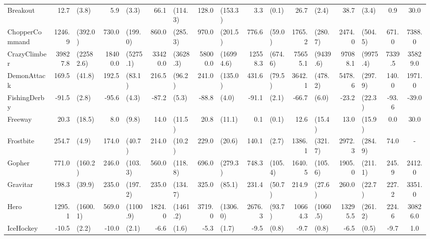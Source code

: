 \begin{landscape}
\begin{changemargin}{0cm}{0cm}
\begin{center}
\begin{table}[!htbp]
\begin{tabular}{l|rl|rl|rl|rl|rl|rl|rl|c|c}
Breakout       &     12.7 &      (3.8) &      5.9 &     (3.3) &       66.1 &      (114.3) &    128.0 &    (153.3) &      3.3 &    (0.1) &     26.7 &      (2.4) &      38.7 &      (3.4) &      0.9 &     30.0 \\
ChopperCommand &   1246.9 &    (392.0) &    730.0 &   (199.0) &      860.0 &      (285.3) &    970.0 &    (201.5) &    776.6 &   (59.0) &   1765.2 &    (280.7) &    2474.0 &    (504.5) &    671.0 &   7388.0 \\
CrazyClimber   &  39827.8 &  (22582.6) &  18400.0 &  (5275.1) &    33420.0 &     (3628.3) &  58000.0 &  (16994.6) &  12558.3 &  (674.6) &  75655.1 &   (9439.6) &   97088.1 &   (9975.4) &   7339.5 &  35829.0 \\
DemonAttack    &    169.5 &     (41.8) &    192.5 &    (83.1) &      216.5 &       (96.2) &    241.0 &    (135.0) &    431.6 &   (79.5) &   3642.1 &    (478.2) &    5478.6 &    (297.9) &    140.0 &   1971.0 \\
FishingDerby   &    -91.5 &      (2.8) &    -95.6 &     (4.3) &      -87.2 &        (5.3) &    -88.8 &      (4.0) &    -91.1 &    (2.1) &    -66.7 &      (6.0) &     -23.2 &     (22.3) &    -93.6 &    -39.0 \\
Freeway        &     20.3 &     (18.5) &      8.0 &     (9.8) &       14.0 &       (11.5) &     20.8 &     (11.1) &      0.1 &    (0.1) &     12.6 &     (15.4) &      13.0 &     (15.9) &      0.0 &     30.0 \\
Frostbite      &    254.7 &      (4.9) &    174.0 &    (40.7) &      214.0 &       (10.2) &    229.0 &     (20.6) &    140.1 &    (2.7) &   1386.1 &    (321.7) &    2972.3 &    (284.9) &     74.0 &      - \\
Gopher         &    771.0 &    (160.2) &    246.0 &   (103.3) &      560.0 &      (118.8) &    696.0 &    (279.3) &    748.3 &  (105.4) &   1640.5 &    (105.6) &    1905.0 &    (211.1) &    245.9 &   2412.0 \\
Gravitar       &    198.3 &     (39.9) &    235.0 &   (197.2) &      235.0 &      (134.7) &    325.0 &     (85.1) &    231.4 &   (50.7) &    214.9 &     (27.6) &     260.0 &     (22.7) &    227.2 &   3351.0 \\
Hero           &   1295.1 &   (1600.1) &    569.0 &  (1100.9) &     1824.0 &     (1461.2) &   3719.0 &   (1306.0) &   2676.3 &   (93.7) &  10664.3 &   (1060.5) &   13295.5 &    (261.2) &    224.6 &  30826.0 \\
IceHockey      &    -10.5 &      (2.2) &    -10.0 &     (2.1) &       -6.6 &        (1.6) &     -5.3 &      (1.7) &     -9.5 &    (0.8) &     -9.7 &      (0.8) &      -6.5 &      (0.5) &     -9.7 &      1.0 \\

\end{tabular}
\end{table}
\end{center}
\end{changemargin}
\end{landscape}
